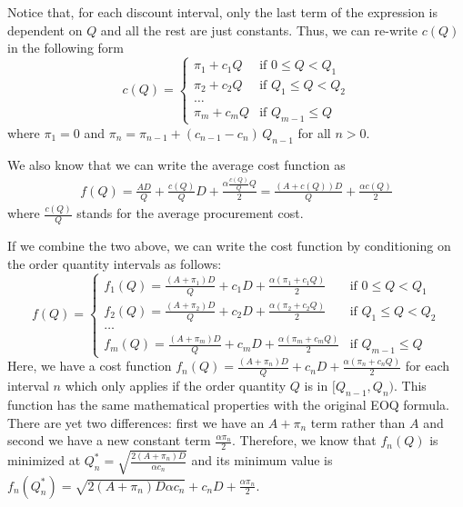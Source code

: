 \begin{exercise}
\begin{solution}
Notice that, for each discount interval, only the last term of the expression is dependent on $Q$ and all the rest are just constants. Thus, we can re-write $c(Q)$ in the following form
\begin{equation*}
c(Q) = 
\begin{cases}
\pi_1 + c_1 Q & \text{if } 0 \leq Q < Q_1 \\
\pi_2 + c_2 Q & \text{if } Q_1 \leq Q < Q_2 \\
\ldots \\
\pi_m + c_m Q & \text{if } Q_{m-1} \leq Q 
\end{cases}
\end{equation*}
where $\pi_1=0$ and $\pi_n=\pi_{n-1}+(c_{n-1}-c_n)\,Q_{n-1}$ for all $n>0$.

We also know that we can write the average cost function as 
\begin{align*}
f(Q) = \frac{AD}{Q} + \frac{c(Q)}{Q} D + \frac{\alpha \frac{c(Q)}{Q}Q}{2} = \frac{(A+c(Q))D}{Q} + \frac{\alpha c(Q)}{2} 
\end{align*}
where $\frac{c(Q)}{Q}$ stands for the average procurement cost. 

If we combine the two above, we can write the cost function by conditioning on the order quantity intervals as follows:
\begin{equation*}
f(Q) = 
\begin{cases}
f_1(Q) = \frac{(A+\pi_1)D}{Q} + c_1 D + \frac{\alpha (\pi_1 + c_1 Q)}{2} & \text{if } 0 \leq Q < Q_1 \\
f_2(Q) = \frac{(A+\pi_2)D}{Q} + c_2 D + \frac{\alpha (\pi_2 + c_2 Q)}{2} & \text{if } Q_1 \leq Q < Q_2 \\
\ldots \\
f_m(Q) = \frac{(A+\pi_m)D}{Q} + c_m D + \frac{\alpha (\pi_m + c_m Q)}{2} & \text{if } Q_{m-1} \leq Q 
\end{cases}
\end{equation*}
Here, we have a cost function $f_n(Q) = \frac{(A+\pi_n)D}{Q} + c_n D + \frac{\alpha (\pi_n + c_n Q)}{2}$ for each interval $n$ which only applies if the order quantity $Q$ is in $[Q_{n-1},Q_n)$. This function has the same mathematical properties with the original EOQ formula. There are yet two differences: first we have an $A+\pi_n$ term rather than $A$ and second we have a new constant term $\frac{\alpha \pi_n}{2}$. Therefore, we know that $f_n(Q)$ is minimized at $Q^*_n=\sqrt{\frac{2(A+\pi_n)D}{\alpha c_n}}$ and its minimum value is $f_n(Q^*_n)=\sqrt{2(A+\pi_n)D\alpha c_n}+c_n D+\frac{\alpha \pi_n}{2}$.


\end{solution}
\end{exercise}
